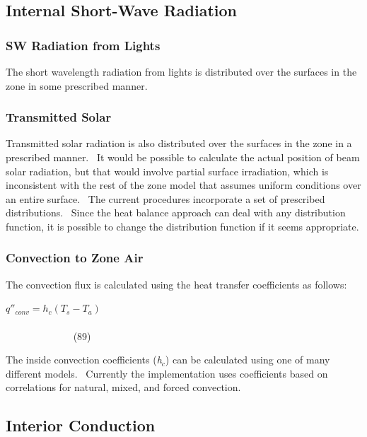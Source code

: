 \subsection{Internal Short-Wave Radiation}\label{internal-short-wave-radiation}

\subsubsection{SW Radiation from Lights}\label{sw-radiation-from-lights}

The short wavelength radiation from lights is distributed over the surfaces in the zone in some prescribed manner.

\subsubsection{Transmitted Solar}\label{transmitted-solar}

Transmitted solar radiation is also distributed over the surfaces in the zone in a prescribed manner.~ It would be possible to calculate the actual position of beam solar radiation, but that would involve partial surface irradiation, which is inconsistent with the rest of the zone model that assumes uniform conditions over an entire surface.~ The current procedures incorporate a set of prescribed distributions.~ Since the heat balance approach can deal with any distribution function, it is possible to change the distribution function if it seems appropriate.

\subsubsection{Convection to Zone Air}\label{convection-to-zone-air}

The convection flux is calculated using the heat transfer coefficients as follows:

\({q''_{conv}} = {h_c}({T_s} - {T_a})\) ~~~~~~~~~~~~~~~~~~~~~~~~~~~~~~~~~~~~~~~~~~~~~~~~~~~~~~~~~~~~~~~~~~~~~~~~~~~~~~~~~~~~~ (89)

The inside convection coefficients (\emph{h\(_{c}\)}) can be calculated using one of many different models.~ Currently the implementation uses coefficients based on correlations for natural, mixed, and forced convection.

\subsection{Interior Conduction}\label{interior-conduction}

